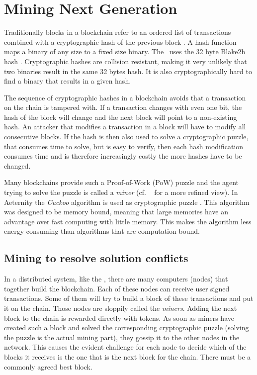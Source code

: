 \section{Mining Next Generation}
\label{sect:mining}

Traditionally blocks in a blockchain refer to an ordered list of
transactions combined with a cryptographic hash of the previous block
\cite{whatisablockchain,raikwar2019sok}. A hash function maps a
binary of any size to a fixed size binary. The \blockchain\
uses the 32 byte Blake2b hash \cite{aumasson2013blake2}. Cryptographic
hashes are collision resistant, making it very unlikely that two binaries
result in the same 32 bytes hash. It is also cryptographically hard
to find a binary that results in a given hash.

The sequence of cryptographic hashes in a blockchain avoids
that a transaction on the chain is tampered with. If a transaction
changes with even one bit, the hash of the block will change and the
next block will point to a non-existing hash. An attacker that
modifies a transaction in a block will have to modify all consecutive
blocks. If the hash is then also used to solve a cryptographic puzzle,
that consumes time to solve, but is easy to verify, then each hash
modification consumes time and is therefore increasingly costly the
more hashes have to be changed.

Many blockchains provide such a Proof-of-Work (PoW) puzzle and the agent
trying to solve the puzzle is called a \textit{miner} (cf. \ \cite{wang2018survey} for a more
refined view).  In Aeternity the \textit{Cuckoo}
algorithm is used as cryptographic puzzle \cite{Tromp2015CuckooCA}. This
algorithm was designed to be memory bound, meaning that large memories
have an advantage over fast computing with little memory. This makes
the algorithm less energy consuming than algorithms that are
computation bound.

\subsection{Mining to resolve solution conflicts}

In a distributed system, like the \blockchain, there are many
computers (nodes) that together build the blockchain. Each of these nodes
can receive user signed transactions. Some of them will try to build a
block of these transactions and put it on the chain. Those nodes are
sloppily called the \textit{miners}. Adding the next
block to the chain is rewarded directly with tokens. As soon as miners
have created such a block and solved the corresponding cryptographic
puzzle (solving the puzzle is the actual mining part), they gossip it
to the other nodes in the network.
This causes the evident challenge for each node to decide  which of the blocks
it receives is the one that is the next block for the chain. There
must be a commonly agreed best block.

